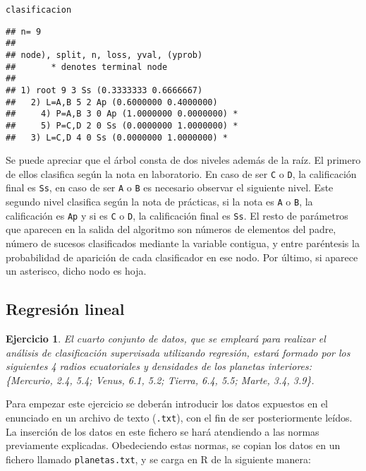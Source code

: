 \documentclass[12pt]{report}\usepackage[]{graphicx}\usepackage[dvipsnames]{xcolor}
\makeatletter
\newcommand{\hlstd}[1]{\textcolor[rgb]{0.345,0.345,0.345}{#1}}%
\newenvironment{kframe}{%
 \def\at@end@of@kframe{}%
 \ifinner\ifhmode%
  \def\at@end@of@kframe{\end{minipage}}%
  \begin{minipage}{\columnwidth}%
 \fi\fi%
 \def\FrameCommand##1{\hskip\@totalleftmargin \hskip-\fboxsep
 \colorbox{shadecolor}{##1}\hskip-\fboxsep
     \hskip-\linewidth \hskip-\@totalleftmargin \hskip\columnwidth}%
 \MakeFramed {\advance\hsize-\width
   \@totalleftmargin\z@ \linewidth\hsize
   \@setminipage}}%
 {\par\unskip\endMakeFramed%
 \at@end@of@kframe}
\newenvironment{knitrout}{}{} %
\newtheorem{exercise}{Ejercicio}[section]
\makeatother
\begin{document}
\begin{knitrout}
\color{fgcolor}\begin{kframe}
\begin{alltt}
\hlstd{clasificacion}
\end{alltt}
\begin{verbatim}
## n= 9 
## 
## node), split, n, loss, yval, (yprob)
##       * denotes terminal node
## 
## 1) root 9 3 Ss (0.3333333 0.6666667)  
##   2) L=A,B 5 2 Ap (0.6000000 0.4000000)  
##     4) P=A,B 3 0 Ap (1.0000000 0.0000000) *
##     5) P=C,D 2 0 Ss (0.0000000 1.0000000) *
##   3) L=C,D 4 0 Ss (0.0000000 1.0000000) *
\end{verbatim}
\end{kframe}
\end{knitrout}
				
				Se puede apreciar que el árbol consta de dos niveles además de la raíz. El primero de ellos clasifica según la nota en laboratorio. En caso de ser \texttt{C} o \texttt{D}, la calificación final es \texttt{Ss}, en caso de ser \texttt{A} o \texttt{B} es necesario observar el siguiente nivel. Este segundo nivel clasifica según la nota de prácticas, si la nota es \texttt{A} o \texttt{B}, la calificación es \texttt{Ap} y si es \texttt{C} o \texttt{D}, la calificación final es \texttt{Ss}. El resto de parámetros que aparecen en la salida del algoritmo son números de elementos del padre, número de sucesos clasificados mediante la variable contigua, y entre paréntesis la probabilidad de aparición de cada clasificador en ese nodo. Por último, si aparece un asterisco, dicho nodo es hoja. 
		
		\subsection{Regresión lineal}
		
			\begin{exercise}
				El cuarto conjunto de datos, que se empleará para realizar el análisis de clasificación supervisada utilizando regresión, estará formado por los siguientes 4 radios ecuatoriales y densidades de los planetas interiores:
				\{Mercurio, 2.4, 5.4; Venus, 6.1, 5.2; Tierra, 6.4, 5.5; Marte, 3.4, 3.9\}.
			\end{exercise}
			
			Para empezar este ejercicio se deberán introducir los datos expuestos en el enunciado en un archivo de texto (\texttt{.txt}), con el fin de ser posteriormente leídos. La inserción de los datos en este fichero se hará atendiendo a las normas previamente explicadas. Obedeciendo estas normas, se copian los datos en un fichero llamado \texttt{planetas.txt}, y se carga en R de la siguiente manera:
			
\end{document}
